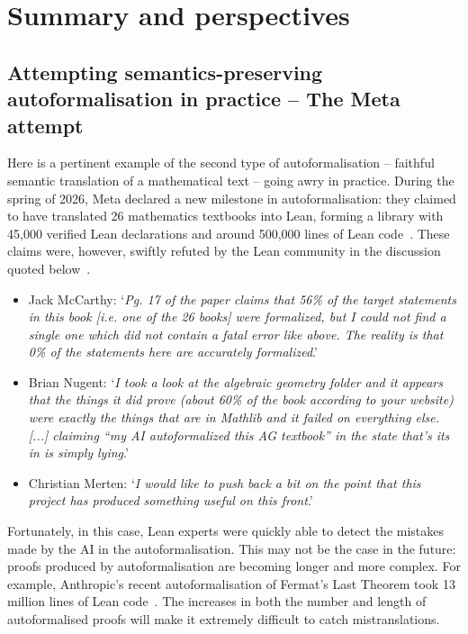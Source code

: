 \documentclass[10pt, a4paper, reqno]{amsart}
\numberwithin{equation}{section}
\theoremstyle{definition}
\theoremstyle{definition}
\begin{document}
\section{Summary and perspectives}
\subsection{Attempting semantics-preserving autoformalisation in practice -- The Meta attempt}\label{sec:meta}
Here is a pertinent example of the second type of autoformalisation -- faithful semantic translation of a mathematical text -- going awry in practice.  During the spring of 2026, Meta declared a new milestone in autoformalisation: they claimed to have translated 26 mathematics textbooks into Lean, forming a library with 45,000 verified Lean declarations and around 500,000 lines of Lean code~\cite{RammalEtAl2026}. These claims were, however, swiftly refuted by the Lean community in the discussion quoted below~\cite{LeanCommunityAtlas2026}.
\begin{itemize}
	\item[(i)] Jack McCarthy: `\textit{Pg. 17 of the paper claims that 56\% of the target statements in this book [i.e. one of the 26 books] were formalized, but I could not find a single one which did not contain a fatal error like above. The reality is that 0\% of the statements here are accurately formalized}.'
	\item[(ii)] Brian Nugent: `\textit{I took a look at the algebraic geometry folder and it appears that the things it did prove (about 60\%
		of the book according to your website) were exactly the things that are in Mathlib and it failed on everything else. [...] claiming ``my AI autoformalized this AG textbook'' in the state that’s its in is simply lying}.'
	\item[(iii)] Christian Merten: `\textit{I would like to push back a bit on the point that this project has produced something useful on this front}.'
\end{itemize}
Fortunately, in this case, Lean experts were quickly able to detect the mistakes made by the AI in the autoformalisation. This may not be the case in the future:  proofs produced by autoformalisation are becoming longer and more complex. For example, Anthropic's recent autoformalisation of Fermat's Last Theorem took 13 million lines of Lean code~\cite{Buzzard2026}. The increases in both the number and length of autoformalised proofs will make it extremely difficult to catch mistranslations.
\end{document}
